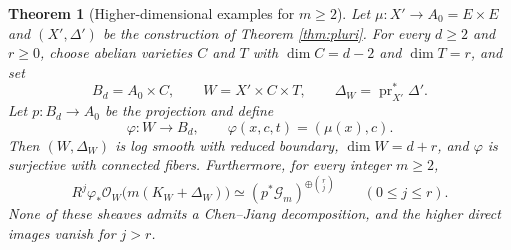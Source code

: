 \documentclass[10pt,a4paper]{amsart}
\newtheorem{theorem}{Theorem}[section]
\newcommand{\OO}{\mathcal O}
\newcommand{\GG}{\mathcal G}
\DeclareMathOperator{\pr}{pr}
\begin{document}
\begin{theorem}[Higher-dimensional examples for $m\ge2$]\label{thm:pluriproduct}
Let $\mu:X'\to A_0=E\times E$ and $(X',\Delta')$ be the construction of Theorem \ref{thm:pluri}. For every $d\ge2$ and $r\ge0$, choose abelian varieties $C$ and $T$ with $\dim C=d-2$ and $\dim T=r$, and set
\[
B_d=A_0\times C,\qquad W=X'\times C\times T,\qquad\Delta_W=\pr_{X'}^*\Delta'.
\]
Let $p:B_d\to A_0$ be the projection and define
\[
\varphi:W\longrightarrow B_d,\qquad\varphi(x,c,t)=(\mu(x),c).
\]
Then $(W,\Delta_W)$ is log smooth with reduced boundary, $\dim W=d+r$, and $\varphi$ is surjective with connected fibers. Furthermore, for every integer $m\ge2$,
\[
R^j\varphi_*\OO_W\bigl(m(K_W+\Delta_W)\bigr)
\simeq(p^*\GG_m)^{\oplus\binom rj}\qquad(0\le j\le r).
\]
None of these sheaves admits a Chen--Jiang decomposition, and the higher direct images vanish for $j>r$.
\end{theorem}
\end{document}
